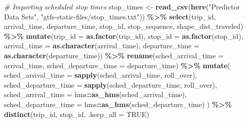 \documentclass[
  12pt,
]{article}
\newenvironment{Shaded}{\begin{snugshade}}{\end{snugshade}}
\newcommand{\AttributeTok}[1]{\textcolor[rgb]{0.13,0.29,0.53}{#1}}
\newcommand{\CommentTok}[1]{\textcolor[rgb]{0.56,0.35,0.01}{\textit{#1}}}
\newcommand{\ConstantTok}[1]{\textcolor[rgb]{0.56,0.35,0.01}{#1}}
\newcommand{\FunctionTok}[1]{\textcolor[rgb]{0.13,0.29,0.53}{\textbf{#1}}}
\newcommand{\NormalTok}[1]{#1}
\newcommand{\OtherTok}[1]{\textcolor[rgb]{0.56,0.35,0.01}{#1}}
\newcommand{\SpecialCharTok}[1]{\textcolor[rgb]{0.81,0.36,0.00}{\textbf{#1}}}
\newcommand{\StringTok}[1]{\textcolor[rgb]{0.31,0.60,0.02}{#1}}
\begin{document}
\begin{Shaded}
\begin{Highlighting}[]
\CommentTok{\# Importing scheduled stop times}
\NormalTok{stop\_times }\OtherTok{\textless{}{-}} \FunctionTok{read\_csv}\NormalTok{(}\FunctionTok{here}\NormalTok{(}\StringTok{"Predictor Data Sets"}\NormalTok{,}
                            \StringTok{"gtfs{-}static{-}files/stop\_times.txt"}\NormalTok{)) }\SpecialCharTok{\%\textgreater{}\%}
  \FunctionTok{select}\NormalTok{(trip\_id, arrival\_time, departure\_time, stop\_id, stop\_sequence, }
\NormalTok{         shape\_dist\_traveled) }\SpecialCharTok{\%\textgreater{}\%}
  \FunctionTok{mutate}\NormalTok{(}\AttributeTok{trip\_id =} \FunctionTok{as.factor}\NormalTok{(trip\_id),}
         \AttributeTok{stop\_id =} \FunctionTok{as.factor}\NormalTok{(stop\_id),}
         \AttributeTok{arrival\_time =} \FunctionTok{as.character}\NormalTok{(arrival\_time),}
         \AttributeTok{departure\_time =} \FunctionTok{as.character}\NormalTok{(departure\_time)) }\SpecialCharTok{\%\textgreater{}\%}
  \FunctionTok{rename}\NormalTok{(}\AttributeTok{sched\_arrival\_time =}\NormalTok{ arrival\_time,}
         \AttributeTok{sched\_departure\_time =}\NormalTok{ departure\_time) }\SpecialCharTok{\%\textgreater{}\%}
   \FunctionTok{mutate}\NormalTok{(}
    \AttributeTok{sched\_arrival\_time =} \FunctionTok{sapply}\NormalTok{(sched\_arrival\_time, roll\_over),}
    \AttributeTok{sched\_departure\_time =} \FunctionTok{sapply}\NormalTok{(sched\_departure\_time, roll\_over),}
    \AttributeTok{sched\_arrival\_time =}\NormalTok{ hms}\SpecialCharTok{::}\FunctionTok{as\_hms}\NormalTok{(sched\_arrival\_time),}
    \AttributeTok{sched\_departure\_time =}\NormalTok{ hms}\SpecialCharTok{::}\FunctionTok{as\_hms}\NormalTok{(sched\_departure\_time)}
\NormalTok{  ) }\SpecialCharTok{\%\textgreater{}\%}
  \FunctionTok{distinct}\NormalTok{(trip\_id, stop\_id, }\AttributeTok{.keep\_all =} \ConstantTok{TRUE}\NormalTok{)}


\end{Highlighting}
\end{Shaded}
\end{document}
